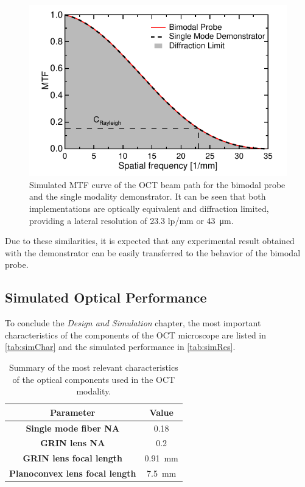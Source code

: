 \begin{figure}[h!]\centering
      \includegraphics{figures/30_DesignSimulation/Optical/MTF/MTFComparison.pdf}
      \caption{Simulated MTF curve of the OCT beam path for the bimodal probe and the single modality demonstrator. It can be seen that both implementations are optically equivalent and diffraction limited, providing a lateral resolution of 23.3 lp/mm or \SI{43}{\micro\meter}.}
      \label{fig:MTFcomp}
\end{figure}

Due to these similarities, it is expected that any experimental result obtained with the demonstrator can be easily transferred to the behavior of the bimodal probe.

\subsection{Simulated Optical Performance}

To conclude the \textit{Design and Simulation} chapter, the most important characteristics of the components of the OCT microscope are listed in \autoref{tab:simChar} and the simulated performance in \autoref{tab:simRes}.

\begin{table}[h!]\centering
	\caption{Summary of the most relevant characteristics of the optical components used in the OCT modality.}
	\begin{tabular}{cc}\\
		\textbf{Parameter} & \textbf{Value} \\ 		
		\hline
     	\textbf{Single mode fiber NA} & 0.18 \\ 
		\textbf{GRIN lens NA} & 0.2 \\ 
		\textbf{GRIN lens focal length} & \SI{0.91}{\milli\meter} \\ 
		\textbf{Planoconvex lens focal length} & \SI{7.5}{\milli\meter} \\ 
		\hline
	\end{tabular}
\label{tab:simChar}
\end{table}

